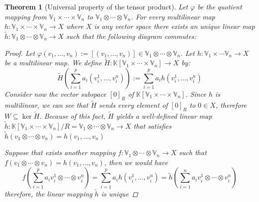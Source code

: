 \documentclass[11pt,a4paper,openright,oneside]{book}
\numberwithin{equation}{section}
\newtheorem{thm0}[defn0]{Theorem}
\newenvironment{theorem}{\bigskip \begin{thm0}}{\end{thm0}}
\begin{document}
\begin{theorem}[Universal property of the tensor product]
    Let $\varphi$ be the quotient mapping from $\mathbb{V}_1 \times \cdots \times \mathbb{V}_n$ to $\mathbb{V}_1 \otimes \cdots \otimes \mathbb{V}_n$. 
    For every multilinear map $h: \mathbb{V}_1 \times \cdots \times \mathbb{V}_n \rightarrow X$ where $X$ is any vector space there exists an unique linear map 
    $\tilde{h}: \mathbb{V}_1 \otimes \cdots \otimes \mathbb{V}_n \rightarrow X$ such that the following diagram commutes:

    \centering


\begin{proof}
    Let $\varphi(v_1, \dots, v_n) := [(v_1, \dots, v_n)] \in \mathbb{V}_1 \otimes \cdots \otimes \mathbb{V}_n$. Let $h : \mathbb{V}_1 \times \cdots \mathbb{V}_n \rightarrow X$ be a
    multilinear map. We define $\tilde H : \mathbb{K}[\mathbb{V}_1 \times \cdots \times \mathbb{V}_n] \rightarrow X$ by:
    $$\tilde H \left( \sum_{i=1}^p a_i (v_i^1, \dots, v_i^n) \right) := \sum_{i=1}^p a_i h(v_i^1, \dots, v_i^n) $$
    Consider now the vector subspace $[0]_R$ of $\mathbb{K}[\mathbb{V}_1 \times \cdots \times \mathbb{V}_n]$.
    Since $h$ is multilinear, we can see that $\tilde H$ sends every element of $[0]_R$ to
    $0 \in X$, therefore $W \subseteq \ker{ \tilde H}$. Because of this fact, $\tilde H$ yields a well-defined linear map $\tilde h: \mathbb{K}[\mathbb{V}_1 \times \cdots \times \mathbb{V}_n]/R = \mathbb{V}_1 \otimes \cdots \otimes \mathbb{V}_n \rightarrow X$
    that satisfies $\tilde h (v_1 \otimes \cdots \otimes v_n) = h(v_1, \dots, v_n)$

    Suppose that exists another mapping $f : \mathbb{V}_1 \otimes \cdots \otimes \mathbb{V}_n \rightarrow X$ such that $f(v_1 \otimes \cdots \otimes v_n) = h(v_1, \dots, v_n)$, then we would have
    $$f \left( \sum_{i=1}^p a_i v_i^1 \otimes \cdots \otimes v_i^n \right) = \sum_{i=1}^p a_i h(v_i^1, \dots, v_i^n) = \tilde h \left( \sum_{i=1}^n a_i v_i^1 \otimes \cdots \otimes v_i^n \right)$$
    therefore, the linear mapping $\tilde h$ is unique
\end{proof}
\end{theorem}
\end{document}

